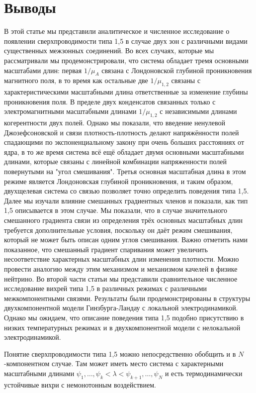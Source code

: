 \chapter{Выводы}
\label{ch:5}

В этой статье мы представили аналитическое и численное исследование о 
появлении сверхпроводимости типа 1,5 в случае двух зон с различными видами 
существенных межзонных соединений. Во всех случаях, которые мы рассматривали 
мы продемонстрировали, что система обладает тремя основными масштабами длин: 
первая \( 1/\mu_A \) связана с Лондоновской глубиной проникновения магнитного 
поля, в то время как остальные две \( 1/\mu_{1,2} \) связаны с 
характеристическими масштабными длина ответственные за изменение глубины 
проникновения поля. В пределе двух конденсатов связанных только с 
электромагнитными масштабными длинами \( 1/\mu_{1,2} \) с независимыми  
длинами когерентности двух полей. Однако мы показали, что введение ненулевой 
Джозефсоновской и связи плотность-плотность делают напряжённости полей 
спадающими по экспоненциальному закону при очень больших расстояниях от ядра, 
в то же время система всё ещё обладает двумя основными масштабными длинами, 
которые связаны с линейной комбинации напряженности полей повернутыми на 
"угол смешивания". Третья основная масштабная длина в этом режиме является 
Лондоновская глубиной проникновения, и таким образом, двухщелевая система со 
связью позволяет точно определить поведения типа 1,5. Далее мы изучали влияние 
смешанных градиентных членов и показали, как тип 1,5 описывается в этом 
случае. Мы показали, что в случае значительного смешанного градиента связи из 
определения трёх основных масштабных длин требуется дополнительные условия, 
поскольку он даёт режим смешивания, который не может быть описан одним углов 
смешивания. Важно отметить нами показанное, что смешанный градиент спаривания 
может увеличить несоответствие характерных масштабных длин изменения 
плотности. Можно провести аналогию между этим механизмом и механизмом качелей 
в физике нейтрино. Во второй части статьи мы представили сравнительное 
численное исследование вихрей типа 1,5 в различных режимах с различными 
межкомпонентными связями. Результаты были продемонстрированы в структуры 
двухкомпонентной модели Гинзбурга-Ландау с локальной электродинамикой. Однако 
мы ожидаем, что описание поведения типа 1,5 подобно присутствию в низких 
температурных режимах и в двухкомпонентной модели с нелокальной 
электродинамикой.   

Понятие сверхпроводимости типа 1,5 можно непосредственно обобщить и в 
\( N \)-компонентном случае. Там может иметь место система с  
характерными масштабными длинами 
\( 
	\psi_1, \ldots, \psi_k < \lambda < \psi_{k+1}, \ldots, \psi_N
\) 
и есть термодинамически устойчивые вихри с немонотонным воздействием. 

